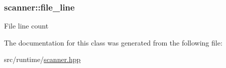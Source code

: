 \subsubsection[{\texorpdfstring{file\+\_\+line}{file_line}}]{ scanner\+::file\+\_\+line\hspace{0.3cm}{\ttfamily [private]}}\hypertarget{classscanner_adf0c8e5cf0ec04c0ff4d7c158f7bcb33}{}\label{classscanner_adf0c8e5cf0ec04c0ff4d7c158f7bcb33}
File line count 

The documentation for this class was generated from the following file\+:\begin{DoxyCompactItemize}
\item 
src/runtime/\hyperlink{scanner_8hpp}{scanner.\+hpp}\end{DoxyCompactItemize}

